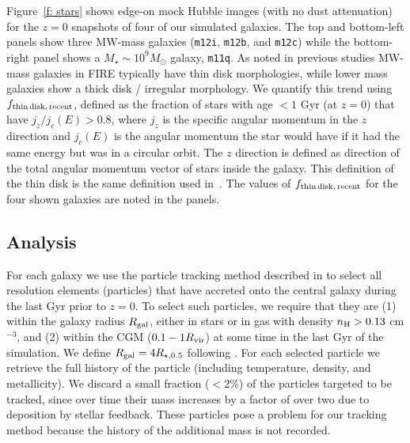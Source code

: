 \documentclass[fleqn,usenatbib]{mnras}
\begin{document}
Figure~\ref{f: stars} shows edge-on mock Hubble images (with no dust attenuation) for the $z=0$ snapshots of four of our simulated galaxies. The top and bottom-left panels show three MW-mass galaxies (\texttt{m12i}, \texttt{m12b}, and \texttt{m12c}) while the bottom-right panel shows a $M_\star \sim 10^9 M_\odot$ galaxy, \texttt{m11q}.
As noted in previous studies \cite{?} MW-mass galaxies in FIRE typically have thin disk morphologies, while lower mass galaxies show a thick disk / irregular morphology. We quantify this trend using $f_{\rm thin\,disk,\,recent}$, defined as the fraction of stars with age $<1$ Gyr (at $z=0$) that have $j_z/j_c(E) > 0.8$, where $j_z$ is the specific angular momentum in the $z$ direction  and $j_c(E)$ is the angular momentum the star would have if it had the same energy but was in a circular orbit. The $z$ direction is defined as direction of the total angular momentum vector of stars inside the galaxy.  This definition of the thin disk is the same definition used in~\cite{Yu2021}. The values of $f_{\rm thin\,disk,\,recent}$ for the four shown galaxies are noted in the panels. 


\subsection{Analysis}
\label{s: methods -- analysis}

For each galaxy we use the particle tracking method described in \cite{Hafen2019, Hafen2020} to select all resolution elements (particles) that have accreted onto the central galaxy during the last Gyr prior to $z=0$. To select such particles, we require that they are (1) within the galaxy radius $R_{\rm gal}$, either in stars or in gas with density  $n_{\rm H} > 0.13$ cm$^{-3}$, and (2) within the CGM ($0.1 -1 R_{\rm vir}$) at some time in the last Gyr of the simulation. 
We define $R_{\rm gal} = 4 R_{\star,0.5}$ following \cite{Hafen2019, Hafen2020}.
For each selected particle we retrieve the full history of the particle (including temperature, density, and metallicity). 
We discard a small fraction ($<2\%$) of the particles targeted to be tracked, since over time their mass increases by a factor of over two due to deposition by stellar feedback. These particles pose a problem for our tracking method because the history of the additional mass is not recorded.
\end{document}
